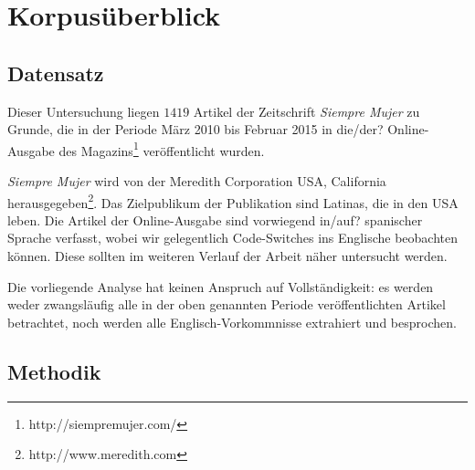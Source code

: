 \section{Korpusüberblick}


\subsection{Datensatz}

Dieser Untersuchung liegen $1419$ Artikel der Zeitschrift \textit{Siempre Mujer} zu Grunde,
die in der Periode März 2010 bis Februar 2015 in die/der? Online-Ausgabe des Magazins\footnote{http://siempremujer.com/} veröffentlicht wurden.

\textit{Siempre Mujer} wird von der Meredith Corporation USA, California herausgegeben\footnote{http://www.meredith.com}.
Das Zielpublikum der Publikation sind Latinas, die in den USA leben. %
Die Artikel der Online-Ausgabe sind vorwiegend in/auf? spanischer Sprache verfasst,
wobei wir gelegentlich Code-Switches ins Englische beobachten können.
Diese sollten im weiteren Verlauf der Arbeit näher untersucht werden.

Die vorliegende Analyse hat keinen Anspruch auf Vollständigkeit:
es werden weder zwangsläufig alle in der oben genannten Periode veröffentlichten Artikel betrachtet,
noch werden alle Englisch-Vorkommnisse extrahiert und besprochen.



\subsection{Methodik}

